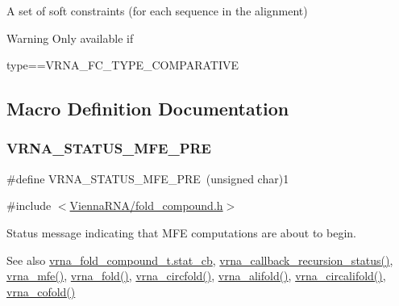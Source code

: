 A set of soft constraints (for each sequence in the alignment) 

\begin{DoxyWarning}{Warning}
Only available if\begin{DoxyVerb}type==VRNA_FC_TYPE_COMPARATIVE \end{DoxyVerb}
 
\end{DoxyWarning}


\subsection{Macro Definition Documentation}
\mbox{\label{group__fold__compound_ga1a5053dc8acbb0111e852988726f07d6}} 
\subsubsection{\texorpdfstring{V\+R\+N\+A\+\_\+\+S\+T\+A\+T\+U\+S\+\_\+\+M\+F\+E\+\_\+\+P\+RE}{VRNA\_STATUS\_MFE\_PRE}}
{\footnotesize\ttfamily \#define V\+R\+N\+A\+\_\+\+S\+T\+A\+T\+U\+S\+\_\+\+M\+F\+E\+\_\+\+P\+RE~(unsigned char)1}



{\ttfamily \#include $<$\hyperlink{fold__compound_8h}{Vienna\+R\+N\+A/fold\+\_\+compound.\+h}$>$}



Status message indicating that M\+FE computations are about to begin. 

\begin{DoxySeeAlso}{See also}
\hyperlink{group__fold__compound_a87a83f6795b569000efcbe65acc3dd81}{vrna\+\_\+fold\+\_\+compound\+\_\+t.\+stat\+\_\+cb}, \hyperlink{group__fold__compound_gac86036fa8cad1108832335063243cdc8}{vrna\+\_\+callback\+\_\+recursion\+\_\+status()}, \hyperlink{group__mfe__global_gabd3b147371ccf25c577f88bbbaf159fd}{vrna\+\_\+mfe()}, \hyperlink{group__mfe__global_ga29a33b2895f4e67b0480271ff289afdc}{vrna\+\_\+fold()}, \hyperlink{group__mfe__global_gaf973483d8acbc8cc9aacfc8a9b7f0074}{vrna\+\_\+circfold()}, \hyperlink{group__mfe__global_ga6c9d3bef3e92c6d423ffac9f981418c1}{vrna\+\_\+alifold()}, \hyperlink{group__mfe__global_ga17a1be7490468c29c335ba9bffacba53}{vrna\+\_\+circalifold()}, \hyperlink{group__mfe__global_ga9ef3a297201dbf838a8daff2b45c0c82}{vrna\+\_\+cofold()} 
\end{DoxySeeAlso}
\mbox{\label{group__fold__compound_ga47c900ca76e56e59e2e83a06e0bde641}} 

